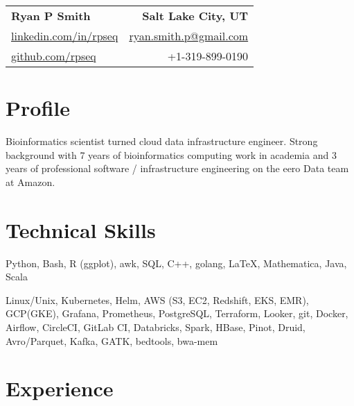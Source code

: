 
\RequirePackage{preamble}



\begin{tabular*}{\textwidth}{l@{\extracolsep{\fill}}r}
	\textbf{{\Large Ryan P Smith}} & \textbf{Salt Lake City, UT} \\
	\href{http://www.linkedin.com/in/rpseq}{linkedin.com/in/rpseq} &
	\href{mailto:ryan.smith.p@gmail.com}{ryan.smith.p@gmail.com} \\
	\href{https://github.com/RPSeq}{github.com/rpseq} & +1-319-899-0190 \\
\end{tabular*}

\section{Profile}

\small{Bioinformatics scientist turned cloud data infrastructure engineer. Strong background with 7 years of bioinformatics computing work in academia and 3 years of professional software / infrastructure engineering on the eero Data team at Amazon.}


\section{Technical Skills}
\resumeSubHeadingListStart

{Python, Bash, R (ggplot), awk, SQL, C++, golang, \LaTeX, Mathematica, Java, Scala}

{Linux/Unix, Kubernetes, Helm, AWS (S3, EC2, Redshift, EKS, EMR), GCP(GKE), Grafana, Prometheus, PostgreSQL, Terraform, Looker, git, Docker, Airflow, CircleCI, GitLab CI, Databricks, Spark, HBase, Pinot, Druid, Avro/Parquet, Kafka, GATK, bedtools, bwa-mem}

\resumeSubHeadingListEnd

\section{Experience}
\resumeSubHeadingListStart

